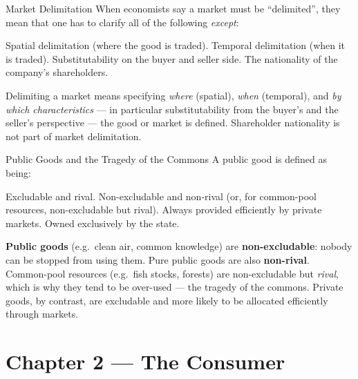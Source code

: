 \begin{question}[type=mc]{Market Delimitation}
When economists say a market must be ``delimited'', they mean that one has to
clarify all of the following \emph{except}:
\begin{choices}
  \choice        Spatial delimitation (where the good is traded).
  \choice        Temporal delimitation (when it is traded).
  \choice        Substitutability on the buyer and seller side.
  \correctchoice The nationality of the company's shareholders.
\end{choices}
\begin{solution}
  Delimiting a market means specifying \emph{where} (spatial), \emph{when}
  (temporal), and \emph{by which characteristics} — in particular
  substitutability from the buyer's and the seller's perspective — the good
  or market is defined. Shareholder nationality is not part of market
  delimitation.
\end{solution}
\end{question}

\begin{question}[type=mc]{Public Goods and the Tragedy of the Commons}
A public good is defined as being:
\begin{choices}
  \choice        Excludable and rival.
  \correctchoice Non-excludable and non-rival (or, for common-pool resources,
                 non-excludable but rival).
  \choice        Always provided efficiently by private markets.
  \choice        Owned exclusively by the state.
\end{choices}
\begin{solution}
  \textbf{Public goods} (e.g.\ clean air, common knowledge) are
  \textbf{non-excludable}: nobody can be stopped from using them. Pure public
  goods are also \textbf{non-rival}. Common-pool resources (e.g.\ fish stocks,
  forests) are non-excludable but \emph{rival}, which is why they tend to be
  over-used — the tragedy of the commons. Private goods, by contrast, are
  excludable and more likely to be allocated efficiently through markets.
\end{solution}
\end{question}


\section{Chapter 2 — The Consumer}

